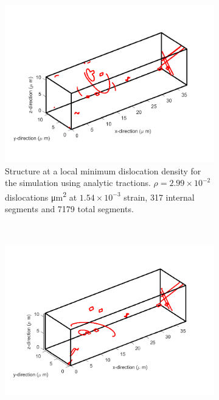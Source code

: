 \begin{figure}
    \begin{subfigure}[t]{0.45\linewidth}
        \centering
        \includegraphics[width=\linewidth]{../data/minDens_nSeg_317_nSegTot_7179_11-Mar-2021_8_tensile_ni_100.pdf}
        \caption[Structure at a local minimum dislocation density for the simulation using analytic tractions.]{Structure at a local minimum dislocation density for the simulation using analytic tractions. $\rho = 2.99\times 10^{-2}$ dislocations \si{\micro\metre^{2}} at $1.54\times 10^{-3}$ strain, 317 internal segments and 7179 total segments.}
        \label{sf:minDensAna}
    \end{subfigure}
    ~
    \begin{subfigure}[t]{0.45\linewidth}
        \centering
        \includegraphics[width=\linewidth]{../data/minDens_nSeg_204_nSegTot_8204_11-Mar-2021_numT_8_tensile_ni_100.pdf}

\end{subfigure}
\end{figure}
